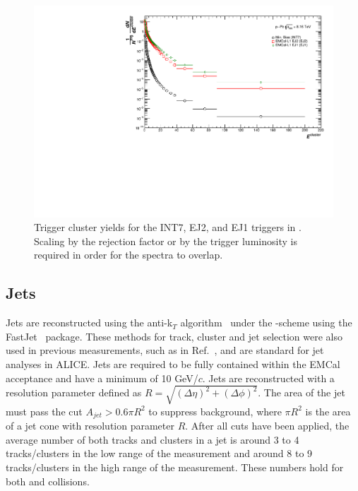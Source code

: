 \begin{figure}[hbt!]
    \centering
    \includegraphics[width=15cm]{figures/pPbFigures/TriggerClusters/clusters_R02.pdf}
    \caption{Trigger cluster yields for the INT7, EJ2, and EJ1 triggers in \pPb. Scaling by the rejection factor or by the trigger luminosity is required in order for the spectra to overlap.}
    \label{fig:triggerClusters_pPb}
\end{figure}

\subsection{Jets}
\label{sec:JetSelection}

Jets are reconstructed using the anti-k$_T$ algorithm~\cite{Cacciari:2008gp} under the \pT-scheme using the FastJet~\cite{Cacciari:2011ma} package. These methods for track, cluster and jet selection were also used in previous measurements, such as in Ref.~\cite{anaNoteMFasel}, and are standard for jet analyses in ALICE. Jets are required to be fully contained within the EMCal acceptance and have a minimum \pT of 10 GeV/$c$. Jets are reconstructed with a resolution parameter defined as $R = \sqrt{(\Delta\eta)^2 + (\Delta\phi)^2}$. The area of the jet must pass the cut $A_{jet} > 0.6\pi R^2$ to suppress background, where $\pi R^2$ is the area of a jet cone with resolution parameter $R$. After all cuts have been applied, the average number of both tracks and clusters in a jet is around 3 to 4 tracks/clusters in the low \pT range of the measurement and around 8 to 9 tracks/clusters in the high \pT range of the measurement. These numbers hold for both \pp and \pPb collisions.

